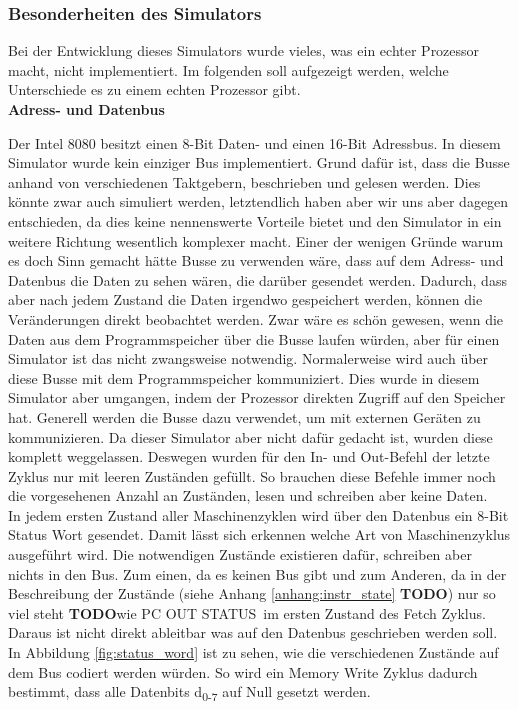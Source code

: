 \documentclass[12pt]{article}
\newcommand{\todo}{\textbf{TODO}}
\begin{document}
\subsubsection{Besonderheiten des Simulators}
Bei der Entwicklung dieses Simulators wurde vieles, was ein echter Prozessor macht, nicht implementiert. Im folgenden soll aufgezeigt werden, welche Unterschiede es zu einem echten Prozessor gibt.
\\

\noindent
\textbf{Adress- und Datenbus}

\noindent
Der Intel 8080 besitzt einen 8-Bit Daten- und einen 16-Bit Adressbus. 
In diesem Simulator wurde kein einziger Bus implementiert. Grund dafür ist, dass die Busse anhand von verschiedenen Taktgebern, beschrieben und gelesen werden. Dies könnte zwar auch simuliert werden, letztendlich haben aber wir uns aber dagegen entschieden, da dies keine nennenswerte Vorteile bietet und den Simulator in ein weitere Richtung wesentlich komplexer macht. Einer der wenigen Gründe warum es doch Sinn gemacht hätte Busse zu verwenden wäre, dass auf dem Adress- und Datenbus die Daten zu sehen wären, die darüber gesendet werden. Dadurch, dass aber nach jedem Zustand die Daten irgendwo gespeichert werden, können die Veränderungen direkt beobachtet werden. Zwar wäre es schön gewesen, wenn die Daten aus dem Programmspeicher über die Busse laufen würden, aber für einen Simulator ist das nicht zwangsweise notwendig. Normalerweise wird auch über diese Busse mit dem Programmspeicher kommuniziert. Dies wurde in diesem Simulator aber umgangen, indem der Prozessor direkten Zugriff auf den Speicher hat. Generell werden die Busse dazu verwendet, um mit externen Geräten zu kommunizieren. Da dieser Simulator aber nicht dafür gedacht ist, wurden diese komplett weggelassen. Deswegen wurden für den In- und Out-Befehl der letzte Zyklus nur mit leeren Zuständen gefüllt. So brauchen diese Befehle immer noch die vorgesehenen Anzahl an Zuständen, lesen und schreiben aber keine Daten.
\\

\noindent
In jedem ersten Zustand aller Maschinenzyklen wird über den Datenbus ein 8-Bit Status Wort gesendet. Damit lässt sich erkennen welche Art von Maschinenzyklus ausgeführt wird. 
Die notwendigen Zustände existieren dafür, schreiben aber nichts in den Bus. Zum einen, da es keinen Bus gibt und zum Anderen, da in der Beschreibung der Zustände (siehe Anhang \ref{anhang:instr_state} \textbf{TODO}) nur so viel steht \todo wie \glqq PC OUT STATUS\grqq\ im ersten Zustand des Fetch Zyklus. Daraus ist nicht direkt ableitbar was auf den Datenbus geschrieben werden soll. In Abbildung \ref{fig:status_word} ist zu sehen, wie die verschiedenen Zustände auf dem Bus codiert werden würden. So wird ein Memory Write Zyklus dadurch bestimmt, dass alle Datenbits d\textsubscript{0-7} auf Null gesetzt werden.
\end{document}
